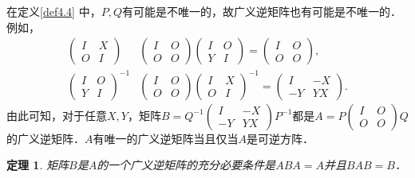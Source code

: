 \documentclass[a4paper,fontset=windows]{ctexbook}
\newtheorem{theorem}{定理}[chapter]
\theoremstyle{definition}
\begin{document}
在定义\ref{def4.4} 中，$P,Q$有可能是不唯一的，故广义逆矩阵也有可能是不唯一的．例如，
\begin{align*}
\begin{pmatrix}I&X \\ O&I\end{pmatrix}&\begin{pmatrix}I&O \\ O&O\end{pmatrix}\begin{pmatrix}I&O \\ Y&I\end{pmatrix}=\begin{pmatrix}I&O \\ O&O\end{pmatrix}, \\
\begin{pmatrix}I&O \\ Y&I\end{pmatrix}^{-1}&\begin{pmatrix}I&O \\ O&O\end{pmatrix}\begin{pmatrix}I&X \\ O&I\end{pmatrix}^{-1}=\begin{pmatrix}I&-X \\ -Y&YX\end{pmatrix}.
\end{align*}
由此可知，对于任意$X,Y$，矩阵$B=Q^{-1}\begin{pmatrix}I&-X \\ -Y&YX\end{pmatrix}P^{-1}$都是$A=P\begin{pmatrix}I&O \\ O&O\end{pmatrix}Q$的广义逆矩阵．$A$有唯一的广义逆矩阵当且仅当$A$是可逆方阵．

\begin{theorem}\label{thm4.9}
矩阵$B$是$A$的一个广义逆矩阵的充分必要条件是$ABA=A$并且$BAB=B$．
\end{theorem}
\end{document}
